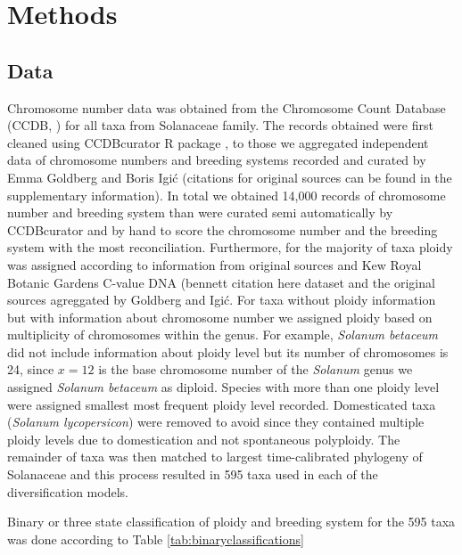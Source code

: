 \section{Methods}

\subsection{Data}

Chromosome number data was obtained from the Chromosome Count Database (CCDB, \citet{rice_2015}) for all taxa from Solanaceae family.
The records obtained were first cleaned using CCDBcurator R package \citep{zenilferguson_2017}, to those we aggregated independent data of chromosome numbers and breeding systems recorded and curated by Emma Goldberg and Boris Igi\'c  (citations for original sources can be found in the supplementary information).
In total we obtained 14,000 records of chromosome number and breeding system than were curated semi automatically by CCDBcurator and by hand to score the chromosome number and the breeding system with the most reconciliation.
Furthermore, for the majority of taxa ploidy was assigned according to information from original sources and Kew Royal Botanic Gardens C-value DNA (bennett citation here dataset and the original sources agreggated by Goldberg and Igi\'c.
For taxa without ploidy information but with information about chromosome number we assigned ploidy based on multiplicity of chromosomes within the genus.
For example, \textit{Solanum betaceum} did not include information about ploidy level but its number of chromosomes is 24, since $x=12$ is the base chromosome number of the \textit{Solanum} genus we assigned  \textit{Solanum betaceum} as diploid. 
Species with more than one ploidy level were assigned smallest most frequent ploidy level recorded.
Domesticated taxa (\ie \textit{Solanum lycopersicon}) were removed to avoid since they contained multiple ploidy levels due to domestication and not spontaneous polyploidy.
The remainder of taxa was then matched to largest time-calibrated phylogeny of Solanaceae and this process resulted in 595 taxa used in each of the diversification models.

Binary or three state classification of ploidy and breeding system for the 595 taxa  was done according to Table \autoref{tab:binaryclassifications}
  
